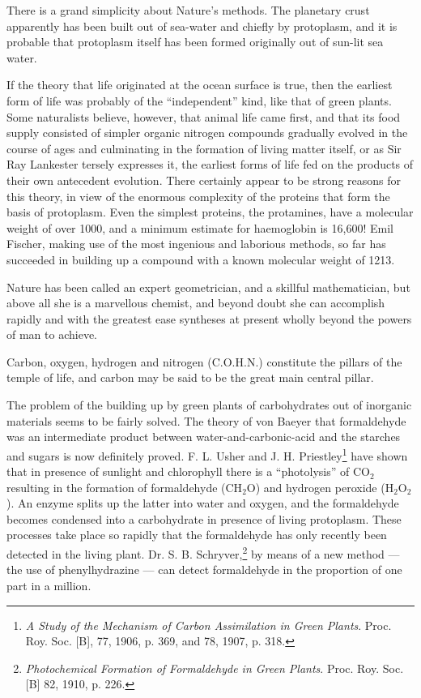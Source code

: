 \documentclass[a4paper, 12pt, oneside]{article}
\begin{document}
There is a grand simplicity about Nature's methods. The planetary crust apparently has been built out of sea-water and chiefly by protoplasm, and it is probable that protoplasm itself has been formed originally out of sun-lit sea water.

If the theory that life originated at the ocean surface is true, then the earliest form of life was probably of the ``independent'' kind, like that of green plants. Some naturalists believe, however, that animal life came first, and that its food supply consisted of simpler organic nitrogen compounds gradually evolved in the course of ages and culminating in the formation of living matter itself, or as Sir Ray Lankester tersely expresses it, the earliest forms of life fed on the products of their own antecedent evolution. There certainly appear to be strong reasons for this theory, in view of the enormous complexity of the proteins that form the basis of protoplasm. Even the simplest proteins, the protamines, have a molecular weight of over 1000, and a minimum estimate for haemoglobin is 16,600! Emil Fischer, making use of the most ingenious and laborious methods, so far has succeeded in building up a compound with a known molecular weight of 1213.

Nature has been called an expert geometrician, and a skillful mathematician, but above all she is a marvellous chemist, and beyond doubt she can accomplish rapidly and with the greatest ease syntheses at present wholly beyond the powers of man to achieve.

Carbon, oxygen, hydrogen and nitrogen (C.O.H.N.) constitute the pillars of the temple of life, and carbon may be said to be the great main central pillar.

The problem of the building up by green plants of carbohydrates out of inorganic materials seems to be fairly solved. The theory of von Baeyer that formaldehyde was an intermediate product between water-and-carbonic-acid and the starches and sugars is now definitely proved. F. L. Usher and J. H. Priestley\footnote{\emph{A Study of the Mechanism of Carbon Assimilation in Green Plants}. Proc. Roy. Soc. [B], 77, 1906, p. 369, and 78, 1907, p. 318.} have shown that in presence of sunlight and chlorophyll there is a ``photolysis'' of CO$_{2}$ resulting in the formation of formaldehyde (CH$_{2}$O) and hydrogen peroxide (H$_{2}$O$_{2}$). An enzyme splits up the latter into water and oxygen, and the formaldehyde becomes condensed into a carbohydrate in presence of living protoplasm. These processes take place so rapidly that the formaldehyde has only recently been detected in the living plant. Dr. S. B. Schryver,\footnote{\emph{Photochemical Formation of Formaldehyde in Green Plants}. Proc. Roy. Soc. [B] 82, 1910, p. 226.} by means of a new method --- the use of phenylhydrazine --- can detect formaldehyde in the proportion of one part in a million.
\end{document}

